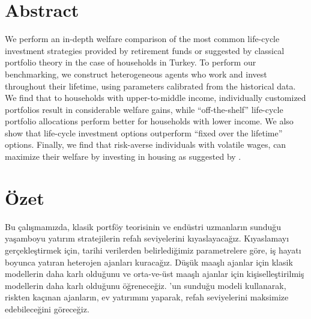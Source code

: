 \chapter*{Abstract\\\ttitle}

We perform an in-depth welfare comparison of the most common life-cycle investment strategies provided by retirement funds or suggested by classical portfolio theory in the case of households in Turkey. To perform our benchmarking, we construct heterogeneous agents who work and invest throughout their lifetime, using parameters calibrated from the historical data. We find that to households with upper-to-middle income, individually customized portfolios result in considerable welfare gains, while ``off-the-shelf'' life-cycle portfolio allocations perform better for households with lower income. We also show that life-cycle investment options outperform ``fixed over the lifetime'' options. Finally, we find that risk-averse individuals with volatile wages, can maximize their welfare by investing in housing as suggested by \citet{munk}.
\newpage

\chapter*{Özet\\\ttitletr}
 
Bu çalışmamızda, klasik portföy teorisinin ve endüstri uzmanların sunduğu yaşamboyu yatırım stratejilerin refah seviyelerini kıyaslayacağız. Kıyaslamayı gerçekleştirmek için, tarihi verilerden belirlediğimiz parametrelere göre, iş hayatı boyunca yatıran heterojen ajanları kuracağız. Düşük maaşlı ajanlar için klasik modellerin daha karlı olduğunu ve orta-ve-üst maaşlı ajanlar için kişiselleştirilmiş modellerin daha karlı olduğunu öğreneceğiz. \citet{munk}'un sunduğu modeli kullanarak, riskten kaçınan ajanların, ev yatırımını yaparak, refah seviyelerini maksimize edebileceğini göreceğiz.
